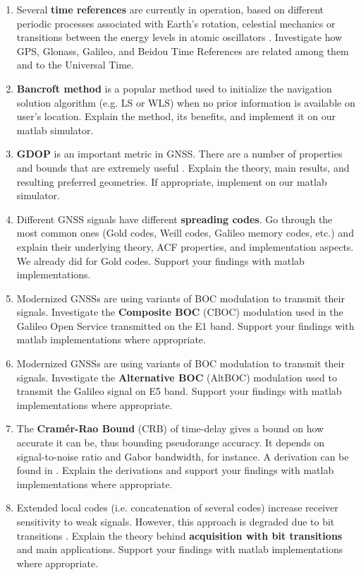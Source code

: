\documentclass[11pt]{article}
\begin{document}
\begin{enumerate}
	\item Several \textbf{time references} are currently in operation, based on different periodic processes associated with Earth's rotation, celestial mechanics or transitions between the energy levels in atomic oscillators \cite{subirana2013gnss}. Investigate how GPS, Glonass, Galileo, and Beidou Time References are related among them and to the Universal Time. 
	\item \textbf{Bancroft method} is a popular method used to initialize the navigation solution algorithm (e.g. LS or WLS) when no prior information is available on user's location. Explain the method, its benefits, and implement it on our matlab simulator. 
	\item \textbf{GDOP} is an important metric in GNSS. There are a number of properties and bounds that are extremely useful \cite{yarlagadda2000gps}. Explain the theory, main results, and resulting preferred geometries. If appropriate, implement on our matlab simulator. 
	\item Different GNSS signals have different \textbf{spreading codes}. Go through the most common ones (Gold codes, Weill codes, Galileo memory codes, etc.) and explain their underlying theory, ACF properties, and implementation aspects. We already did for Gold codes. Support your findings with matlab implementations.
	\item Modernized GNSSs are using variants of BOC modulation to transmit their signals. Investigate the \textbf{Composite BOC} (CBOC) modulation used in the Galileo Open Service transmitted on the E1 band. Support your findings with matlab implementations where appropriate.
	\item Modernized GNSSs are using variants of BOC modulation to transmit their signals. Investigate the \textbf{Alternative BOC} (AltBOC) modulation used to transmit the Galileo signal on E5 band. Support your findings with matlab implementations where appropriate.
	\item The \textbf{Cram\'er-Rao Bound} (CRB) of time-delay gives a bound on how accurate it can be, thus bounding pseudorange accuracy. It depends on signal-to-noise ratio and Gabor bandwidth, for instance. A derivation can be found in \cite{5310316}. Explain the derivations and support your findings with matlab implementations where appropriate. 
	\item Extended local codes (i.e. concatenation of several codes) increase receiver sensitivity to weak signals. However, this approach is degraded due to bit transitions \cite{presti2009gnss}. Explain the theory behind \textbf{acquisition with bit transitions} and main applications. Support your findings with matlab implementations where appropriate. 

\end{enumerate}
\end{document}
